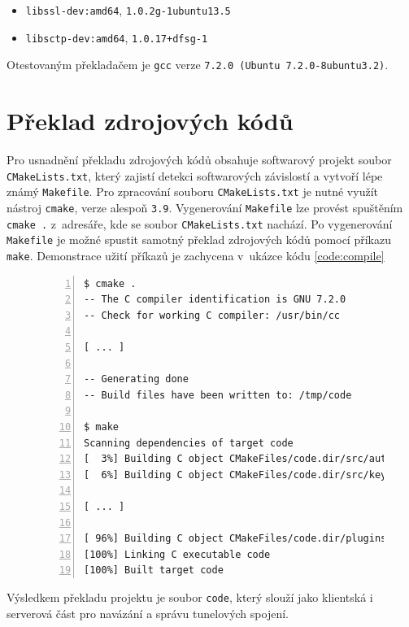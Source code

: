 \documentclass[thesis=M,czech]{FITthesis}[2012/10/20]
\begin{document}
\begin{itemize}
  \item \texttt{libssl-dev:amd64}, \texttt{1.0.2g-1ubuntu13.5}
 \item \texttt{libsctp-dev:amd64}, \texttt{1.0.17+dfsg-1}
\end{itemize}

Otestovaným překladačem je \texttt{gcc} verze \texttt{7.2.0 (Ubuntu 7.2.0-8ubuntu3.2)}.

\section{Překlad zdrojových kódů}

Pro usnadnění překladu zdrojových kódů obsahuje softwarový projekt soubor \texttt{CMakeLists.txt}, který zajistí detekci softwarových závislostí a vytvoří lépe známý \texttt{Makefile}. Pro zpracování souboru \texttt{CMakeLists.txt} je nutné využít nástroj \texttt{cmake}, verze alespoň \texttt{3.9}. Vygenerování \texttt{Makefile} lze provést spuštěním \texttt{cmake .} z~adresáře, kde se soubor \texttt{CMakeLists.txt} nachází. Po vygenerování \texttt{Makefile} je možné spustit samotný překlad zdrojových kódů pomocí příkazu \texttt{make}. Demonstrace užití příkazů je zachycena v~ukázce kódu \ref{code:compile}

\begin{figure}[h]
	\begin{lstlisting}[label=code:compile,caption=Ukázka překladu zdrojových kódů aplikace,frame=single,numbers=left]
$ cmake .
-- The C compiler identification is GNU 7.2.0
-- Check for working C compiler: /usr/bin/cc

[ ... ]

-- Generating done
-- Build files have been written to: /tmp/code

$ make
Scanning dependencies of target code
[  3%] Building C object CMakeFiles/code.dir/src/auth.c.o
[  6%] Building C object CMakeFiles/code.dir/src/keyfile.c.o

[ ... ]

[ 96%] Building C object CMakeFiles/code.dir/plugins/udp/udp.c.o
[100%] Linking C executable code
[100%] Built target code
      \end{lstlisting}
    \end{figure}

    Výsledkem překladu projektu je soubor \texttt{code}, který slouží jako klientská i serverová část pro navázání a správu tunelových spojení.
    
\end{document}
